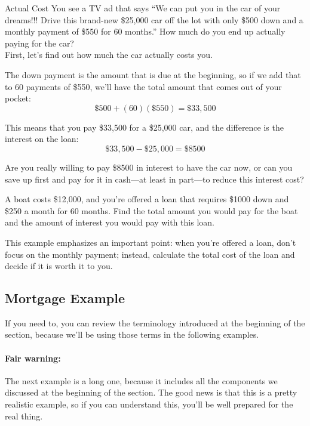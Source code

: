 \begin{example}[https://www.youtube.com/watch?v=rhTeMJm8-Lc&list=PLfmpjsIzhztsZtnb7HnXrQ8SLoiOCIcAM&index=36]{Actual Cost}
You see a TV ad that says ``We can put you in the car of your dreams!!! Drive this brand-new \$25,000 car off the lot with only \$500 down and a monthly payment of \$550 for 60 months.''  How much do you end up actually paying for the car?\\

\solline
{}
First, let's find out how much the car actually costs you.

The down payment is the amount that is due at the beginning, so if we add that to 60 payments of \$550, we'll have the total amount that comes out of your pocket:
\[\$500 + (60)(\$550) = \$33,500\]

This means that you pay \$33,500 for a \$25,000 car, and the difference is the interest on the loan:\marginnote{\footnotesize\textcolor{black!60}{Photo by Christopher Ziemnowicz}}
\[\$33,500 - \$25,000 = \boxed{\$8500}\]

Are you really willing to pay \$8500 in interest to have the car now, or can you save up first and pay for it in cash---at least in part---to reduce this interest cost?
\end{example}

\begin{try}
A boat costs \$12,000, and you're offered a loan that requires \$1000 down and \$250 a month for 60 months.  Find the total amount you would pay for the boat and the amount of interest you would pay with this loan.
\end{try}

This example emphasizes an important point: when you're offered a loan, don't focus on the monthly payment; instead, calculate the total cost of the loan and decide if it is worth it to you.
\vfill
\pagebreak

\subsection{Mortgage Example}
If you need to, you can review the terminology introduced at the beginning of the section, because we'll be using those terms in the following examples.

\paragraph{Fair warning:} The next example is a long one, because it includes all the components we discussed at the beginning of the section.  The good news is that this is a pretty realistic example, so if you can understand this, you'll be well prepared for the real thing.

